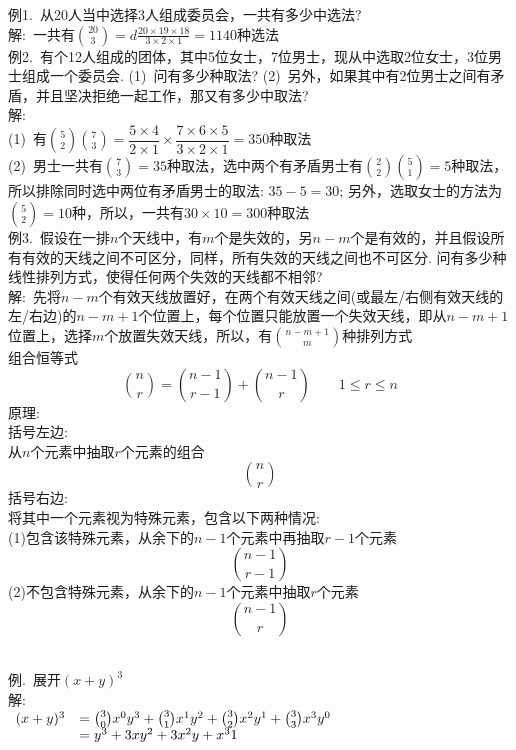例1.\ 从20人当中选择3人组成委员会，一共有多少中选法?\\
解:\ 一共有$\binom{20}{3}=d\frac{20\times 19\times 18}{3\times 2\times 1}=1140$种选法\\[1ex]

例2.\ 有个12人组成的团体，其中5位女士，7位男士，现从中选取2位女士，3位男士组成一个委员会.
(1)\ 问有多少种取法?
(2)\ 另外，如果其中有2位男士之间有矛盾，并且坚决拒绝一起工作，那又有多少中取法?\\
解:\\
(1)\ 有$\binom{5}{2}\binom{7}{3}=\dfrac{5\times 4}{2\times 1}\times\dfrac{7\times 6\times 5}{3\times 2\times 1}=350$种取法\\
(2)\ 男士一共有$\binom{7}{3}=35$种取法，选中两个有矛盾男士有$\binom{2}{2}\binom{5}{1}=5$种取法，所以排除同时选中两位有矛盾男士的取法: $35-5=30$; 另外，选取女士的方法为$\binom{5}{2}=10$种，所以，一共有$30\times 10=300$种取法\\[1ex]

例3.\ 假设在一排$n$个天线中，有$m$个是失效的，另$n-m$个是有效的，并且假设所有有效的天线之间不可区分，同样，所有失效的天线之间也不可区分. 问有多少种线性排列方式，使得任何两个失效的天线都不相邻?\\
解:\ 先将$n-m$个有效天线放置好，在两个有效天线之间(或最左/右侧有效天线的左/右边)的$n-m+1$个位置上，每个位置只能放置一个失效天线，即从$n-m+1$位置上，选择$m$个放置失效天线，所以，有$\binom{n-m+1}{m}$种排列方式\\[2ex]

组合恒等式
\[\binom{n}{r}=\binom{n-1}{r-1}+\binom{n-1}{r}\qquad 1\leqslant r\leqslant n\]
原理:\\
括号左边:\\
从$n$个元素中抽取$r$个元素的组合
\[\binom{n}{r}\]
括号右边:\\
将其中一个元素视为特殊元素，包含以下两种情况:\\
(1)包含该特殊元素，从余下的$n-1$个元素中再抽取$r-1$个元素
\[\binom{n-1}{r-1}\]
(2)不包含特殊元素，从余下的$n-1$个元素中抽取$r$个元素
\[\binom{n-1}{r}\]\\[2ex]

{\par\centering
{}
\par}\vspace{2ex}

例.\ 展开$(x+y)^3$\\
解:\\
$\begin{array}{r l}
(x+y)^3 & =\binom{3}{0}x^0y^3+\binom{3}{1}x^1y^2+\binom{3}{2}x^2y^1+\binom{3}{3}x^3y^0\\
& =y^3+3xy^2+3x^2y+x^31
\end{array}$
